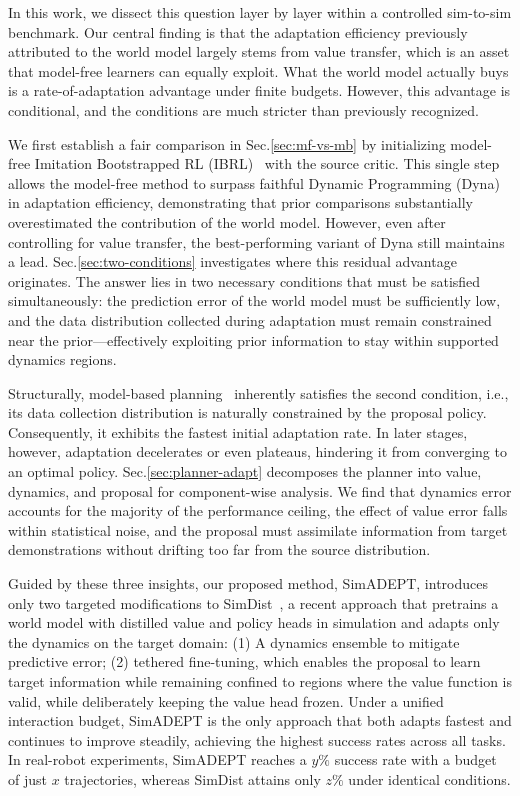 \documentclass{article} %
\begin{document}
In this work, we dissect this question layer by layer within a controlled sim-to-sim benchmark. Our central finding is that the adaptation efficiency previously attributed to the world model largely stems from value transfer, which is an asset that model-free learners can equally exploit. What the world model actually buys is a rate-of-adaptation advantage under finite budgets. However, this advantage is conditional, and the conditions are much stricter than previously recognized.

We first establish a fair comparison in Sec.\ref{sec:mf-vs-mb} by initializing model-free Imitation Bootstrapped RL (IBRL)~\citep{hu2023imitation} with the source critic. This single step allows the model-free method to surpass faithful Dynamic Programming (Dyna)~\citep{feinberg2018model} in adaptation efficiency, demonstrating that prior comparisons substantially overestimated the contribution of the world model. However, even after controlling for value transfer, the best-performing variant of Dyna still maintains a lead. Sec.\ref{sec:two-conditions} investigates where this residual advantage originates. The answer lies in two necessary conditions that must be satisfied simultaneously: the prediction error of the world model must be sufficiently low, and the data distribution collected during adaptation must remain constrained near the prior—effectively exploiting prior information to stay within supported dynamics regions.

Structurally, model-based planning~\citep{hansen2024td} inherently satisfies the second condition, i.e., its data collection distribution is naturally constrained by the proposal policy. Consequently, it exhibits the fastest initial adaptation rate. In later stages, however, adaptation decelerates or even plateaus, hindering it from converging to an optimal policy. Sec.\ref{sec:planner-adapt} decomposes the planner into value, dynamics, and proposal for component-wise analysis. We find that dynamics error accounts for the majority of the performance ceiling, the effect of value error falls within statistical noise, and the proposal must assimilate information from target demonstrations without drifting too far from the source distribution.

Guided by these three insights, our proposed method, SimADEPT, introduces only two targeted modifications to SimDist~\citep{levy2026simulation}, a recent approach that pretrains a world model with distilled value and policy heads in simulation and adapts only the dynamics on the target domain: (1) A dynamics ensemble to mitigate predictive error; (2) tethered fine-tuning, which enables the proposal to learn target information while remaining confined to regions where the value function is valid, while deliberately keeping the value head frozen. Under a unified interaction budget, SimADEPT is the only approach that both adapts fastest and continues to improve steadily, achieving the highest success rates across all tasks. In real-robot experiments, SimADEPT reaches a $y\%$ success rate with a budget of just $x$ trajectories, whereas SimDist attains only $z\%$ under identical conditions.
\end{document}
